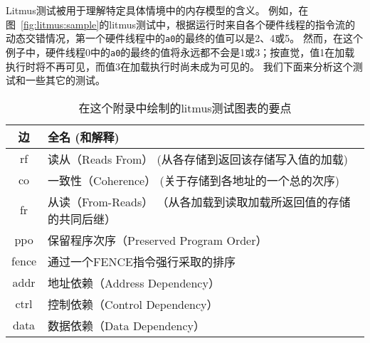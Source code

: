 Litmus测试被用于理解特定具体情境中的内存模型的含义。
例如，在图~\ref{fig:litmus:sample}的litmus测试中，根据运行时来自各个硬件线程的指令流的动态交错情况，第一个硬件线程中的{\tt a0}的最终的值可以是2、4或5。
然而，在这个例子中，硬件线程0中的{\tt a0}的最终的值将永远都不会是1或3；按直觉，值1在加载执行时将不再可见，而值3在加载执行时尚未成为可见的。
我们下面来分析这个测试和一些其它的测试。

\begin{table}[h]
  \centering\small
  \begin{tabular}{|c|l|}
    \hline
    边       & 全名 (和解释) \\
    \hline
    \sf rf   & 读从（Reads From） (从各存储到返回该存储写入值的加载) \\
    \hline
    \sf co   & 一致性（Coherence） (关于存储到各地址的一个总的次序) \\
    \hline
    \sf fr   & 从读（From-Reads） （从各加载到读取加载所返回值的存储的共同后继） \\
    \hline
    \sf ppo  & 保留程序次序（Preserved Program Order） \\
    \hline
    \sf fence & 通过一个FENCE指令强行采取的排序 \\
    \hline
    \sf addr & 地址依赖（Address Dependency） \\
    \hline
    \sf ctrl & 控制依赖（Control Dependency） \\
    \hline
    \sf data & 数据依赖（Data Dependency） \\
    \hline
  \end{tabular}
  \caption{在这个附录中绘制的litmus测试图表的要点}
  \label{tab:litmus:key}
\end{table}

